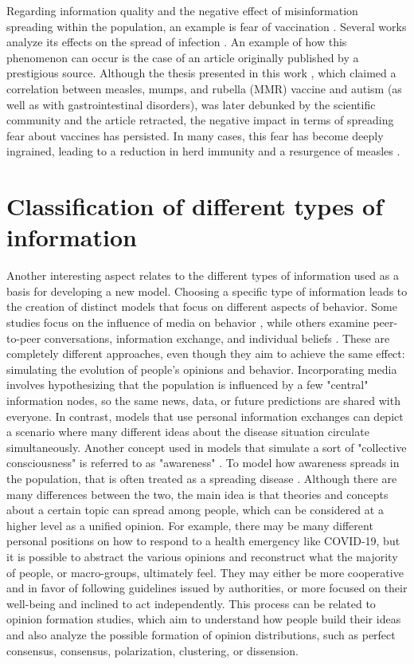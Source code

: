 Regarding information quality and the negative effect of misinformation spreading within the population, an example is fear of vaccination \cite{Kahan_2013}. Several works analyze its effects on the spread of infection \cite{Bauch_2012_game, Epstein_2021}.
An example of how this phenomenon can occur is the case of an article originally published by a prestigious source. Although the thesis presented in this work \cite{wakefield1998retracted}, which claimed a correlation between measles, mumps, and rubella (MMR) vaccine and autism (as well as with gastrointestinal disorders), was later debunked by the scientific community and the article retracted, the negative impact in terms of spreading fear about vaccines has persisted. In many cases, this fear has become deeply ingrained, leading to a reduction in herd immunity and a resurgence of measles \cite{Bauch_2012_overview}.

\section{Classification of different types of information}
Another interesting aspect relates to the different types of information used as a basis for developing a new model. Choosing a specific type of information leads to the creation of distinct models that focus on different aspects of behavior. Some studies focus on the influence of media on behavior \cite{Collinson2014, Misra_2011}, while others examine peer-to-peer conversations, information exchange, and individual beliefs \cite{Tyson_2020}. These are completely different approaches, even though they aim to achieve the same effect: simulating the evolution of people's opinions and behavior. Incorporating media involves hypothesizing that the population is influenced by a few "central" information nodes, so the same news, data, or future predictions are shared with everyone. In contrast, models that use personal information exchanges can depict a scenario where many different ideas about the disease situation circulate simultaneously.
Another concept used in models that simulate a sort of "collective consciousness" is referred to as "awareness" \cite{Funk2009}. To model how awareness spreads in the population, that is often treated as a spreading disease \cite{Silva2019, Granell2013, Granell_2014, Kabir_2019, Zuo_2021, Wang_2019}. Although there are many differences between the two, the main idea is that theories and concepts about a certain topic can spread among people, which can be considered at a higher level as a unified opinion. For example, there may be many different personal positions on how to respond to a health emergency like COVID-19, but it is possible to abstract the various opinions and reconstruct what the majority of people, or macro-groups, ultimately feel. They may either be more cooperative and in favor of following guidelines issued by authorities, or more focused on their well-being and inclined to act independently.
This process can be related to opinion formation studies, which aim to understand how people build their ideas \cite{Devia_2023, Devia2022} and also analyze the possible formation of opinion distributions, such as perfect consensus, consensus, polarization, clustering, or dissension.

